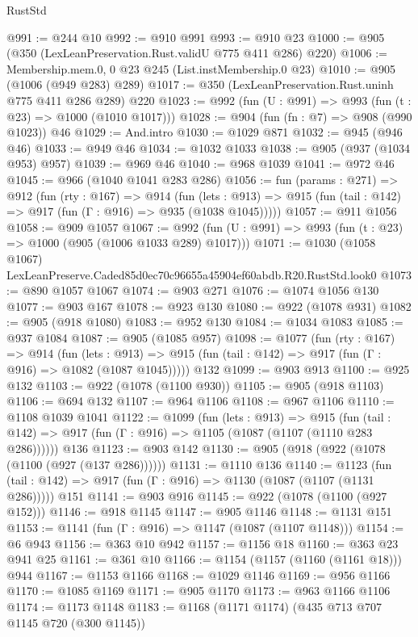 \begin{lexlean}{RustStd}
\begin{coremodule}
@991 := @244 @10
@992 := @910 @991
@993 := @910 @23
@1000 := @905 (@350 (LexLeanPreservation.Rust.validU @775 @411 @286) @220)
@1006 := Membership.mem.{0, 0} @23 @245 (List.instMembership.{0} @23)
@1010 := @905 (@1006 (@949 @283) @289)
@1017 := @350 (LexLeanPreservation.Rust.uninh @775 @411 @286 @289) @220
@1023 := @992 (fun (U : @991) => @993 (fun (t : @23) => @1000 (@1010 @1017)))
@1028 := @904 (fun (fn : @7) => @908 (@990 @1023)) @46
@1029 := And.intro
@1030 := @1029 @871
@1032 := @945 (@946 @46)
@1033 := @949 @46
@1034 := @1032 @1033
@1038 := @905 (@937 (@1034 @953) @957)
@1039 := @969 @46
@1040 := @968 @1039
@1041 := @972 @46
@1045 := @966 (@1040 @1041 @283 @286)
@1056 := fun (params : @271) =>
  @912
    (fun (rty : @167) =>
    @914
      (fun (lets : @913) =>
      @915 (fun (tail : @142) => @917 (fun (Γ : @916) => @935 (@1038 @1045)))))
@1057 := @911 @1056
@1058 := @909 @1057
@1067 := @992 (fun (U : @991) => @993 (fun (t : @23) => @1000 (@905 (@1006 @1033 @289) @1017)))
@1071 := @1030 (@1058 @1067) LexLeanPreserve.Caded85d0ec70c96655a45904ef60abdb.R20.RustStd.look0
@1073 := @890 @1057 @1067
@1074 := @903 @271
@1076 := @1074 @1056 @130
@1077 := @903 @167
@1078 := @923 @130
@1080 := @922 (@1078 @931)
@1082 := @905 (@918 @1080)
@1083 := @952 @130
@1084 := @1034 @1083
@1085 := @937 @1084
@1087 := @905 (@1085 @957)
@1098 := @1077
    (fun (rty : @167) =>
    @914
      (fun (lets : @913) =>
      @915 (fun (tail : @142) => @917 (fun (Γ : @916) => @1082 (@1087 @1045)))))
    @132
@1099 := @903 @913
@1100 := @925 @132
@1103 := @922 (@1078 (@1100 @930))
@1105 := @905 (@918 @1103)
@1106 := @694 @132
@1107 := @964 @1106
@1108 := @967 @1106
@1110 := @1108 @1039 @1041
@1122 := @1099
    (fun (lets : @913) =>
    @915 (fun (tail : @142) => @917 (fun (Γ : @916) => @1105 (@1087 (@1107 (@1110 @283 @286))))))
    @136
@1123 := @903 @142
@1130 := @905 (@918 (@922 (@1078 (@1100 (@927 (@137 @286))))))
@1131 := @1110 @136
@1140 := @1123
    (fun (tail : @142) => @917 (fun (Γ : @916) => @1130 (@1087 (@1107 (@1131 @286)))))
    @151
@1141 := @903 @916
@1145 := @922 (@1078 (@1100 (@927 @152)))
@1146 := @918 @1145
@1147 := @905 @1146
@1148 := @1131 @151
@1153 := @1141 (fun (Γ : @916) => @1147 (@1087 (@1107 @1148)))
@1154 := @6 @943
@1156 := @363 @10 @942
@1157 := @1156 @18
@1160 := @363 @23 @941 @25
@1161 := @361 @10
@1166 := @1154 (@1157 (@1160 (@1161 @18))) @944
@1167 := @1153 @1166
@1168 := @1029 @1146
@1169 := @956 @1166
@1170 := @1085 @1169
@1171 := @905 @1170
@1173 := @963 @1166 @1106
@1174 := @1173 @1148
@1183 := @1168 (@1171 @1174) (@435 @713 @707 @1145 @720 (@300 @1145))

\end{coremodule}
\end{lexlean}
